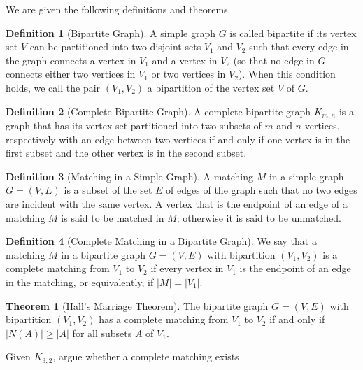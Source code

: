\documentclass[addpoints]{exam}
\theoremstyle{definition}
\newtheorem{definition}{Definition}[section]
\newtheorem{theorem}{Theorem}
\theoremstyle{claim}
\begin{document}
\begin{questions}
\question We are given the following definitions and theorems.

\begin{definition}[Bipartite Graph]
A simple graph $G$ is called bipartite if its vertex set $V$ can be partitioned into two disjoint sets $V_1$ and $V_2$ such that every edge in the graph connects a vertex in $V_1$ and a vertex in $V_2$ (so that no edge in $G$ connects either two vertices in $V_1$ or two vertices in $V_2$). When this condition holds, we call the pair $(V_1, V_2)$ a bipartition of the vertex set $V$ of $G$.
\end{definition}

\begin{definition}[Complete Bipartite Graph]
A complete bipartite graph $K_{m,n}$ is a graph that has its vertex set partitioned into two subsets of $m$ and $n$ vertices, respectively with an edge between two vertices if and only if one vertex is in the first subset and the other vertex is in the second subset.
\end{definition}

\begin{definition}[Matching in a Simple Graph]
 A matching $M$ in a simple graph $G = (V, E)$ is a subset of the set $E$ of edges of the graph such that no two edges are incident with the same vertex.  A vertex that is the endpoint of an edge of a matching $M$ is said to be matched in $M$; otherwise it is said to be unmatched.
\end{definition}

\begin{definition}[Complete Matching in a Bipartite Graph]
We say that a matching $M$ in a bipartite graph $G = (V, E)$ with bipartition $(V_1,V_2)$ is a complete matching from $V_1$ to $V_2$ if every vertex in $V_1$ is the endpoint of an edge in the matching, or equivalently, if $|M| = |V_1|$.
\end{definition}

\begin{theorem}[Hall’s Marriage Theorem]
  The bipartite graph $G = (V, E)$ with bipartition $(V_1, V_2)$ has a complete matching from $V_1$ to $V_2$ if and only if $|N(A)| \geq |A|$ for all subsets $A$ of $V_1$.
\end{theorem}

Given $K_{3,2}$, argue whether a complete matching exists
\begin{parts}

\end{parts}
\end{questions}
\end{document}
